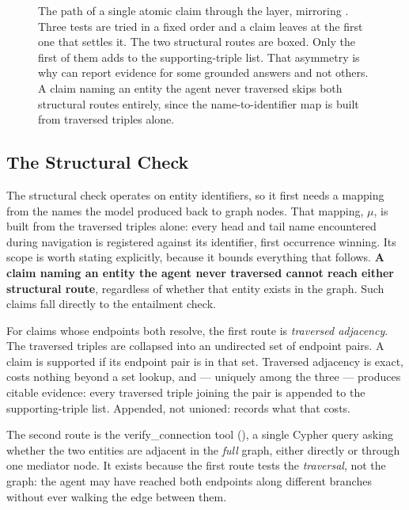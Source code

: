 \begin{figure}[!tbp]
  \begin{center}
    
  \end{center}
  \caption[The path of one claim through the verification layer]{The path of a
  single atomic claim through the layer, mirroring . Three
  tests are tried in a fixed order and a claim leaves at the first one that
  settles it. The two structural routes are boxed. Only the first of them adds
  to the supporting-triple list. That asymmetry is why
   can report evidence for some grounded answers and
  not others. A claim naming an entity the agent never traversed skips both
  structural routes entirely, since the name-to-identifier map is built from
  traversed triples alone.}
  \label{fig:claim-path}
\end{figure}

\subsection{The Structural Check}\label{sec:structural-check}

The structural check operates on entity identifiers, so it first needs a
mapping from the names the model produced back to
graph nodes. That mapping, $\mu$, is built from the traversed triples alone:
every head and tail name encountered during navigation is registered against its
identifier, first occurrence winning. Its scope is worth stating explicitly,
because it bounds everything that follows. \textbf{A claim naming an entity the
agent never traversed cannot reach either structural route}, regardless of
whether that entity exists in the graph. Such claims fall directly to the
entailment check.

For claims whose endpoints both resolve, the first route is \emph{traversed
adjacency}. The traversed triples are collapsed into
an undirected set of endpoint pairs. A claim is supported if its endpoint pair
is in that set. Traversed adjacency is exact, costs nothing beyond a set
lookup, and --- uniquely among the three --- produces citable evidence: every
traversed triple joining the pair is appended to the supporting-triple list.
Appended, not unioned:  records what that costs.

The second route is the \textsf{verify\_connection} tool (), a
single Cypher query asking whether the two entities are adjacent in the
\emph{full} graph, either directly or through one mediator node. It exists
because the first route tests the \emph{traversal}, not the graph: the agent may
have reached both endpoints along different branches without ever walking the
edge between them.

